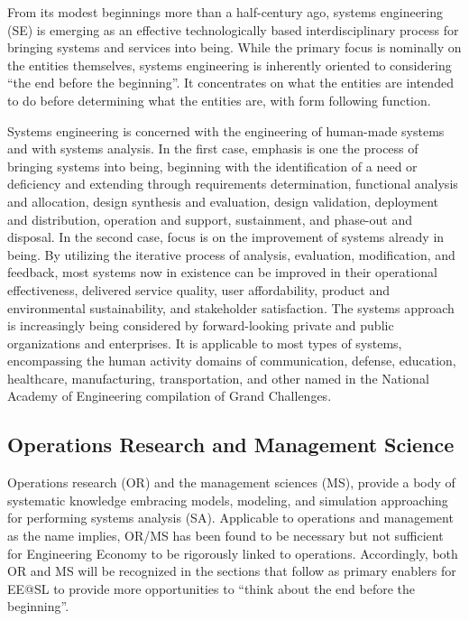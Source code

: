From its modest beginnings more than a half-century ago, systems engineering (SE) is emerging as an effective technologically based interdisciplinary process for bringing systems and services into being. While the primary focus is nominally on the entities themselves, systems engineering is inherently oriented to considering “the end before the beginning”. It concentrates on what the entities are intended to do before determining what the entities are, with form following function.

Systems engineering is concerned with the engineering of human-made systems and with systems analysis. In the first case, emphasis is one the process of bringing systems into being, beginning with the identification of a need or deficiency and extending through requirements determination, functional analysis and allocation, design synthesis and evaluation, design validation, deployment and distribution, operation and support, sustainment, and phase-out and disposal. In the second case, focus is on the improvement of systems already in being. By utilizing the iterative process of analysis, evaluation, modification, and feedback, most systems now in existence can be improved in their operational effectiveness, delivered service quality, user affordability, product and environmental sustainability, and stakeholder satisfaction. The systems approach is increasingly being considered by forward-looking private and public organizations and enterprises. It is applicable to most types of systems, encompassing the human activity domains of communication, defense, education, healthcare, manufacturing, transportation, and other named in the National Academy of Engineering compilation of Grand Challenges.

\subsection{Operations Research and Management Science}

Operations research (OR) and the management sciences (MS), provide a body of systematic knowledge embracing models, modeling, and simulation approaching for performing systems analysis (SA). Applicable to operations and management as the name implies, OR/MS has been found to be necessary but not sufficient for Engineering Economy to be rigorously linked to operations. Accordingly, both OR and MS will be recognized in the sections that follow as primary enablers for EE@SL to provide more opportunities to “think about the end before the beginning”.

